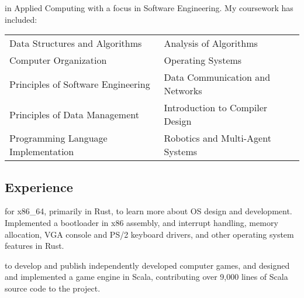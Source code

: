 \documentclass[a4paper]{tufte-handout}
\begin{document}
 in Applied Computing with a focus in Software Engineering. My coursework has included: \\
    {\footnotesize
    \begin{tabular}{l l}
    Data Structures and Algorithms  & Analysis of Algorithms \\
    Computer Organization & Operating Systems \\
    Principles of Software Engineering & Data Communication and Networks \\
    Principles of Data Management & Introduction to Compiler Design\\
    Programming Language Implementation & Robotics and Multi-Agent Systems\\

\end{tabular} }

\subsection{Experience}
 for x86\_64, primarily in Rust, to learn more about OS design and development. Implemented a bootloader in x86 assembly, and interrupt handling, memory allocation, VGA console and PS/2 keyboard drivers, and other operating system features in Rust.

 to develop and publish independently developed computer games, and designed and implemented a game engine in Scala, contributing over 9,000 lines of Scala source code to the project.
\end{document}
